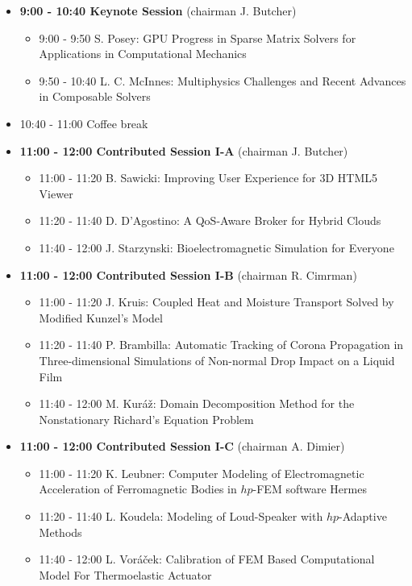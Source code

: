 \documentclass[10pt, A4]{article}%
\begin{document}
\begin{itemize}    
  \item {\bf 9:00 - 10:40 Keynote Session} (chairman J. Butcher) 
  \begin{itemize}
    \item 9:00 - 9:50 S. Posey: GPU Progress in Sparse Matrix Solvers for Applications in Computational Mechanics
    \item 9:50 - 10:40 L. C. McInnes: Multiphysics Challenges and Recent Advances in Composable Solvers
  \end{itemize}
  \item 10:40 - 11:00 Coffee break
  \item {\bf 11:00 - 12:00 Contributed Session I-A} (chairman J. Butcher) 
  \begin{itemize}
    \item 11:00 - 11:20 B. Sawicki: Improving User Experience for 3D HTML5 Viewer
    \item 11:20 - 11:40 D. D'Agostino: A QoS-Aware Broker for Hybrid Clouds
    \item 11:40 - 12:00 J. Starzynski: Bioelectromagnetic Simulation for Everyone 
  \end{itemize}
  \item {\bf 11:00 - 12:00 Contributed Session I-B} (chairman R. Cimrman) 
  \begin{itemize}
	\item 11:00 - 11:20 J. Kruis: Coupled Heat and Moisture Transport Solved by Modified Kunzel's Model  
    \item 11:20 - 11:40 P. Brambilla: Automatic Tracking of Corona Propagation in Three-dimensional Simulations of Non-normal Drop Impact on a Liquid Film       
    \item 11:40 - 12:00 M. Kur\'{a}\v{z}: Domain Decomposition Method for the Nonstationary Richard's Equation Problem
  \end{itemize}
  \item {\bf 11:00 - 12:00 Contributed Session I-C} (chairman A. Dimier) 
  \begin{itemize}
    \item 11:00 - 11:20 K. Leubner: Computer Modeling of Electromagnetic Acceleration of Ferromagnetic Bodies in $hp$-FEM software Hermes
    \item 11:20 - 11:40 L. Koudela: Modeling of Loud-Speaker with $hp$-Adaptive Methods  
    \item 11:40 - 12:00 L. Vor\'{a}\v{c}ek: Calibration of FEM Based Computational Model For Thermoelastic Actuator       

\end{itemize}
\end{itemize}
\end{document}
